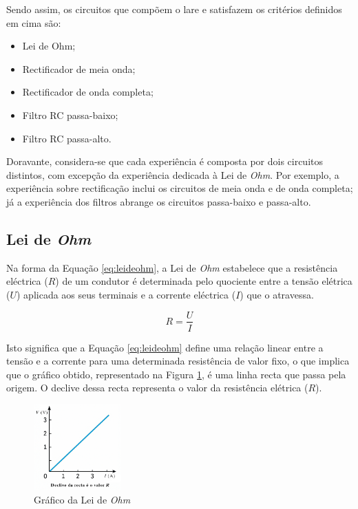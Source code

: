 Sendo assim, os circuitos que compõem o \acrshort{lare} e satisfazem os critérios definidos em cima são:
\begin{itemize}
    \item Lei de Ohm;
    \item Rectificador de meia onda;
    \item Rectificador de onda completa;
    \item Filtro RC passa-baixo;
    \item Filtro RC passa-alto.
\end{itemize}

Doravante, considera-se que cada experiência é composta por dois circuitos distintos, com excepção da experiência dedicada à Lei de \textit{Ohm}. Por exemplo, a experiência sobre rectificação inclui os circuitos de meia onda e de onda completa; já a experiência dos filtros abrange os circuitos passa-baixo e passa-alto.

\subsection{Lei de \textit{Ohm}}
Na forma da Equação \ref{eq:leideohm}, a Lei de \textit{Ohm} estabelece que a resistência eléctrica ($R$) de um condutor é determinada pelo quociente entre a tensão elétrica ($U$) aplicada aos seus terminais e a corrente eléctrica ($I$) que o atravessa.  

\begin{equation} \label{eq:leideohm}
	R=\dfrac{U}{I}
\end{equation}

Isto significa que a Equação \ref{eq:leideohm} define uma relação linear entre a tensão e a corrente para uma determinada resistência de valor fixo, o que implica que o gráfico obtido, representado na Figura \ref{fig:graphohm}, é uma linha recta que passa pela origem. O declive dessa recta representa o valor da resistência elétrica ($R$).

\begin{figure}[hbtp]
	\centering
	\includegraphics[width=0.3\textwidth]{figures/grafico_Ohm.png}
	\caption{Gráfico da Lei de \textit{Ohm}}
	\label{fig:graphohm}
\end{figure}

